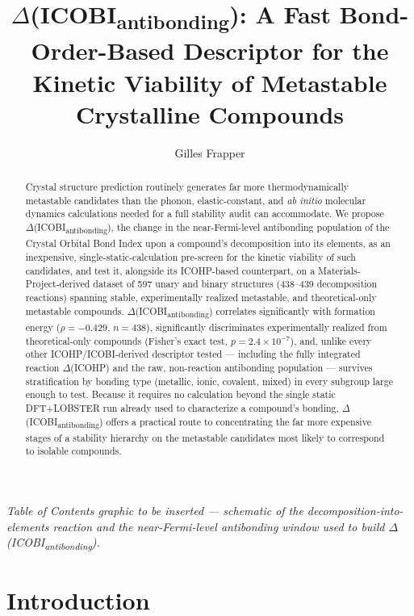 \documentclass[journal=jpccck,manuscript=article]{achemso}
\title{$\Delta$(ICOBI\textsubscript{antibonding}): A Fast Bond-Order-Based
Descriptor for the Kinetic Viability of Metastable Crystalline Compounds}
\author{Gilles Frapper}
\affiliation{IC2MP, UMR 7285 CNRS, Universit\'e de Poitiers, 4 rue Michel
Brunet, TSA 51106, 86073 Poitiers Cedex 9, France}
\begin{document}
\begin{tocentry}
\centering
\textit{Table of Contents graphic to be inserted --- schematic of the
decomposition-into-elements reaction and the near-Fermi-level antibonding
window used to build $\Delta$(ICOBI\textsubscript{antibonding}).}
\end{tocentry}

\begin{abstract}
Crystal structure prediction routinely generates far more thermodynamically
metastable candidates than the phonon, elastic-constant, and \emph{ab
initio} molecular dynamics calculations needed for a full stability audit
can accommodate. We propose $\Delta$(ICOBI\textsubscript{antibonding}), the
change in the near-Fermi-level antibonding population of the Crystal
Orbital Bond Index upon a compound's decomposition into its elements, as an
inexpensive, single-static-calculation pre-screen for the kinetic viability
of such candidates, and test it, alongside its ICOHP-based counterpart, on
a Materials-Project-derived dataset of 597 unary and binary structures
(438--439 decomposition reactions) spanning stable, experimentally
realized metastable, and theoretical-only metastable compounds.
$\Delta$(ICOBI\textsubscript{antibonding}) correlates significantly with
formation energy ($\rho=-0.429$, $n=438$), significantly discriminates
experimentally realized from theoretical-only compounds (Fisher's exact
test, $p=2.4\times10^{-7}$), and, unlike every other ICOHP/ICOBI-derived
descriptor tested --- including the fully integrated reaction
$\Delta$(ICOHP) and the raw, non-reaction antibonding population --- survives
stratification by bonding type (metallic, ionic, covalent, mixed) in every
subgroup large enough to test. Because it requires no calculation beyond
the single static DFT+LOBSTER run already used to characterize a
compound's bonding, $\Delta$(ICOBI\textsubscript{antibonding}) offers a
practical route to concentrating the far more expensive stages of a
stability hierarchy on the metastable candidates most likely to correspond
to isolable compounds.
\end{abstract}

\section{Introduction}
\label{sec:intro}
\end{document}
